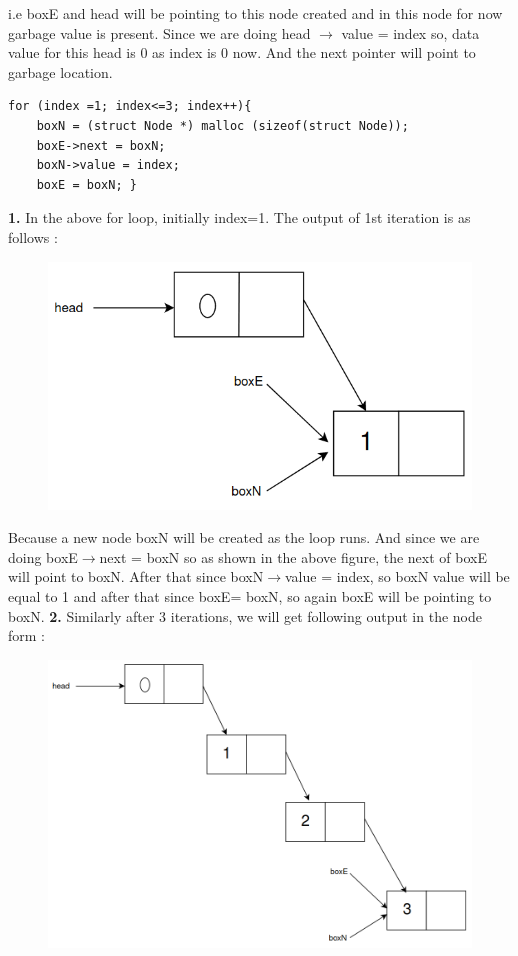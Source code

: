 \documentclass[journal,12pt,twocolumn]{IEEEtran}
\begin{document}
i.e boxE and head will be pointing to this node created and in this node for now garbage value is present. Since we are doing head $\rightarrow$ value = index so, data value for this head is 0 as index is 0 now. And the next pointer will point to garbage location.
\newline
\begin{lstlisting}
for (index =1; index<=3; index++){
	boxN = (struct Node *) malloc (sizeof(struct Node));
	boxE->next = boxN;
	boxN->value = index;
	boxE = boxN; }
\end{lstlisting}
\textbf{1.}
\newline
In the above for loop, initially index=1. The output of 1st iteration is as follows :
\begin{figure}[!h]
	\centering
	\includegraphics[width=\columnwidth]{./figs/2.png}
\end{figure}

Because a new node boxN will be created as the loop runs. And since we are doing boxE$\rightarrow$next = boxN so as shown in the above figure, the next of boxE will point to boxN. After that since boxN$\rightarrow$value = index, so boxN value will be equal to 1 and after that since boxE= boxN, so again boxE will be pointing to boxN.
\newline
\textbf{2.}
\newline
Similarly after 3 iterations, we will get following output in the node form :
\begin{figure}[!h]
	\centering
	\includegraphics[width=\columnwidth]{./figs/3.png}
\end{figure}
\newline
\end{document}
